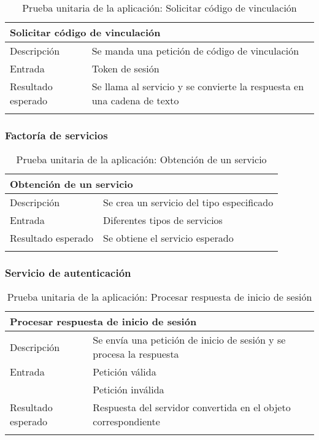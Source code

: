 \vspace{-15pt}
\begin{longtable}{|p{} p{}|}
    \hline
    \multicolumn{2}{|l|}{\textbf{Solicitar código de vinculación}} \\ \hline 
    Descripción                 & Se manda una petición de código de vinculación \\ \hline
    Entrada                     & Token de sesión \\ \hline
    Resultado esperado          & Se llama al servicio y se convierte la respuesta en una cadena de texto \\ \hline
    \caption{Prueba unitaria de la aplicación: Solicitar código de vinculación}
    \label{cp:u:app:solicitar_codigo_vinculacion_repo}
\end{longtable}

\vspace{-15pt}
\subsubsection{Factoría de servicios}

\begin{longtable}{|p{} p{}|}
    \hline
    \multicolumn{2}{|l|}{\textbf{Obtención de un servicio}} \\ \hline 
    Descripción                 & Se crea un servicio del tipo especificado \\ \hline
    Entrada                     & Diferentes tipos de servicios \\ \hline
    Resultado esperado          & Se obtiene el servicio esperado \\ \hline
    \caption{Prueba unitaria de la aplicación: Obtención de un servicio}
    \label{cp:u:app:obtencion_servicio}
\end{longtable}
    
\vspace{-15pt}
\subsubsection{Servicio de autenticación}

\begin{longtable}{|p{} p{}|}
    \hline
    \multicolumn{2}{|l|}{\textbf{Procesar respuesta de inicio de sesión}} \\ \hline 
    Descripción                 & Se envía una petición de inicio de sesión y se procesa la respuesta \\ \hline
    Entrada                     & Petición válida \\
                                & Petición inválida \\ \hline
    Resultado esperado          & Respuesta del servidor convertida en el objeto correspondiente \\ \hline
    \caption{Prueba unitaria de la aplicación: Procesar respuesta de inicio de sesión}
    \label{cp:u:app:respuesta_inicio_sesion}
\end{longtable}

